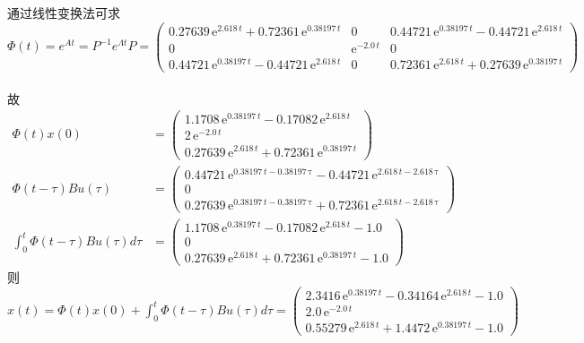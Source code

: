 \documentclass{article}
\begin{document}
通过线性变换法可求 \\
$$ \Phi(t)=
e^{At}=P^{-1}e^{{\Lambda}t}P= \left(\begin{array}{ccc} 0.27639\, \mathrm{e}^{2.618\, t} + 0.72361\, \mathrm{e}^{0.38197\, t} & 0 & 0.44721\, \mathrm{e}^{0.38197\, t} - 0.44721\, \mathrm{e}^{2.618\, t}\\ 0 & \mathrm{e}^{- 2.0\, t} & 0\\ 0.44721\, \mathrm{e}^{0.38197\, t} - 0.44721\, \mathrm{e}^{2.618\, t} & 0 & 0.72361\, \mathrm{e}^{2.618\, t} + 0.27639\, \mathrm{e}^{0.38197\, t} \end{array}\right) $$ \\
\mbox{故 }
\begin{align*}
\Phi(t)x(0) &= \left(\begin{array}{c} 1.1708\, \mathrm{e}^{0.38197\, t} - 0.17082\, \mathrm{e}^{2.618\, t}\\ 2\, \mathrm{e}^{- 2.0\, t}\\ 0.27639\, \mathrm{e}^{2.618\, t} + 0.72361\, \mathrm{e}^{0.38197\, t} \end{array}\right) \\
\Phi(t-\tau)Bu(\tau) &= \left(\begin{array}{c} 0.44721\, \mathrm{e}^{0.38197\, t - 0.38197\, \mathrm{\tau}} - 0.44721\, \mathrm{e}^{2.618\, t - 2.618\, \mathrm{\tau}}\\ 0\\ 0.27639\, \mathrm{e}^{0.38197\, t - 0.38197\, \mathrm{\tau}} + 0.72361\, \mathrm{e}^{2.618\, t - 2.618\, \mathrm{\tau}} \end{array}\right)  \\ 
\int_0^t{\Phi(t-\tau)Bu(\tau)d\tau} &= \left(\begin{array}{c} 1.1708\, \mathrm{e}^{0.38197\, t} - 0.17082\, \mathrm{e}^{2.618\, t} - 1.0\\ 0\\ 0.27639\, \mathrm{e}^{2.618\, t} + 0.72361\, \mathrm{e}^{0.38197\, t} - 1.0 \end{array}\right)
\end{align*}
\mbox{则 }$x(t)=\Phi(t)x(0)+\int_0^t{\Phi(t-\tau)Bu(\tau)d\tau}=\left(\begin{array}{c} 2.3416\, \mathrm{e}^{0.38197\, t} - 0.34164\, \mathrm{e}^{2.618\, t} - 1.0\\ 2.0\, \mathrm{e}^{- 2.0\, t}\\ 0.55279\, \mathrm{e}^{2.618\, t} + 1.4472\, \mathrm{e}^{0.38197\, t} - 1.0 \end{array}\right) $
\end{document}

